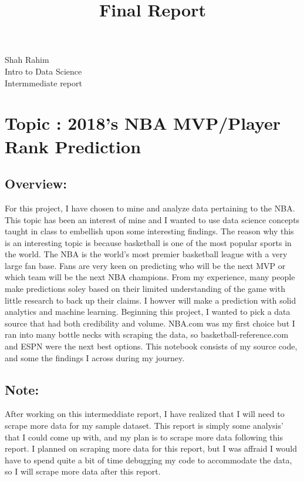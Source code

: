 \documentclass[11pt]{article}
\title{Final Report}
\begin{document}
    
    
    \maketitle
    
    

    
    Shah Rahim\\
Intro to Data Science\\
Intermmediate report

\section{Topic : 2018's NBA MVP/Player Rank
Prediction}\label{topic-2018s-nba-mvpplayer-rank-prediction}

\subsection{Overview:}\label{overview}

For this project, I have chosen to mine and analyze data pertaining to
the NBA. This topic has been an interest of mine and I wanted to use
data science concepts taught in class to embellish upon some interesting
findings. The reason why this is an interesting topic is because
basketball is one of the most popular sports in the world. The NBA is
the world's most premier basketball league with a very large fan base.
Fans are very keen on predicting who will be the next MVP or which team
will be the next NBA champions. From my experience, many people make
predictions soley based on their limited understanding of the game with
little research to back up their claims. I howver will make a prediction
with solid analytics and machine learning. Beginning this project, I
wanted to pick a data source that had both credibility and volume.
NBA.com was my first choice but I ran into many bottle necks with
scraping the data, so basketball-reference.com and ESPN were the next
best options. This notebook consists of my source code, and some the
findings I across during my journey.

\subsection{Note:}\label{note}

After working on this intermeddiate report, I have realized that I will
need to scrape more data for my sample dataset. This report is simply
some analysis' that I could come up with, and my plan is to scrape more
data following this report. I planned on scraping more data for this
report, but I was affraid I would have to spend quite a bit of time
debugging my code to accommodate the data, so I will scrape more data
after this report.
\end{document}

